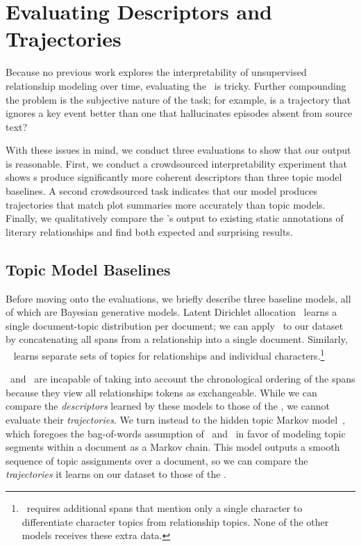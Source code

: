 \section{Evaluating Descriptors and Trajectories}
\label{sec:experiments}

Because no previous work explores the interpretability of
unsupervised relationship modeling over time, evaluating the \rmn\ is
tricky. Further compounding the problem is the subjective nature of
the task; for example, is a trajectory that ignores a key event better
than one that hallucinates episodes absent from source text?

With these issues in mind, we conduct three evaluations to show that our output
is reasonable. First, we conduct a crowdsourced interpretability experiment that
shows \rmn s produce significantly more coherent descriptors than three topic
model baselines. A second crowdsourced task indicates that our model produces
trajectories that match plot summaries more accurately than topic
models. Finally, we qualitatively compare the \rmn's output to existing static
annotations of literary relationships and find both expected and surprising
results.

\subsection{Topic Model Baselines}

Before moving onto the evaluations, we briefly describe three baseline models,
all of which are Bayesian generative models. Latent Dirichlet
allocation~\cite[\lda{}]{blei2003latent} learns a single document-topic
distribution per document; we can apply \lda\ to our dataset by concatenating
all spans from a relationship into a single document. Similarly,
\nubbi~\cite{chang2009connections} learns separate sets of topics for
relationships and individual characters.\footnote{\nubbi\ requires additional
  spans that mention only a single character to differentiate character topics
  from relationship topics. None of the other models receives these extra data.}

\lda\ and \nubbi\ are incapable of taking into account the chronological
ordering of the spans because they view all relationships tokens as
exchangeable. While we can compare the \emph{descriptors} learned by these
models to those of the \rmn, we cannot evaluate their \emph{trajectories}. We
turn instead to the hidden topic Markov model~\cite[\htmm]{gruber2007hidden},
which foregoes the bag-of-words assumption of \lda\ and \nubbi\ in favor of
modeling topic segments within a document as a Markov chain. This model outputs
a smooth sequence of topic assignments over a document, so we can compare the
\emph{trajectories} it learns on our dataset to those of the \rmn.

